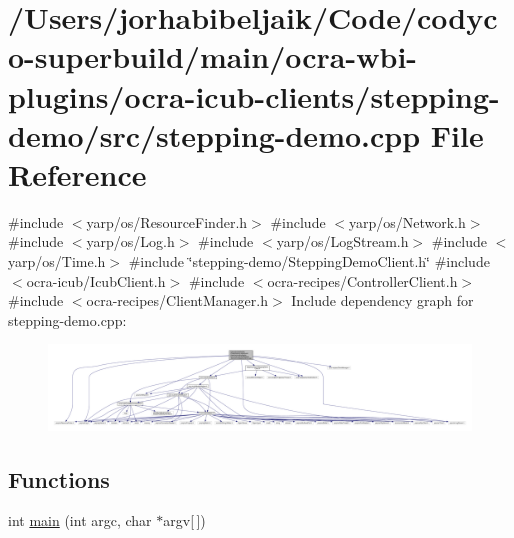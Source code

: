 \hypertarget{stepping-demo_8cpp}{}\section{/\+Users/jorhabibeljaik/\+Code/codyco-\/superbuild/main/ocra-\/wbi-\/plugins/ocra-\/icub-\/clients/stepping-\/demo/src/stepping-\/demo.cpp File Reference}
\label{stepping-demo_8cpp}
{\ttfamily \#include $<$yarp/os/\+Resource\+Finder.\+h$>$}\newline
{\ttfamily \#include $<$yarp/os/\+Network.\+h$>$}\newline
{\ttfamily \#include $<$yarp/os/\+Log.\+h$>$}\newline
{\ttfamily \#include $<$yarp/os/\+Log\+Stream.\+h$>$}\newline
{\ttfamily \#include $<$yarp/os/\+Time.\+h$>$}\newline
{\ttfamily \#include \char`\"{}stepping-\/demo/\+Stepping\+Demo\+Client.\+h\char`\"{}}\newline
{\ttfamily \#include $<$ocra-\/icub/\+Icub\+Client.\+h$>$}\newline
{\ttfamily \#include $<$ocra-\/recipes/\+Controller\+Client.\+h$>$}\newline
{\ttfamily \#include $<$ocra-\/recipes/\+Client\+Manager.\+h$>$}\newline
Include dependency graph for stepping-\/demo.cpp\+:
\nopagebreak
\begin{figure}[H]
\begin{center}
\leavevmode
\includegraphics[width=350pt]{stepping-demo_8cpp__incl}
\end{center}
\end{figure}
\subsection*{Functions}
\begin{DoxyCompactItemize}
\item 
int \hyperlink{stepping-demo_8cpp_a0ddf1224851353fc92bfbff6f499fa97}{main} (int argc, char $\ast$argv\mbox{[}$\,$\mbox{]})
\end{DoxyCompactItemize}


